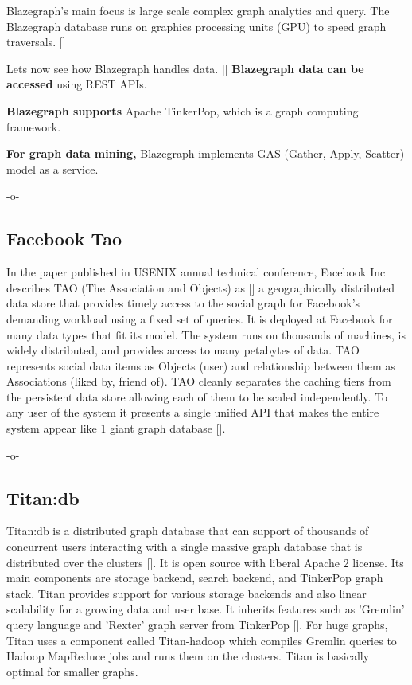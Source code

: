 Blazegraph's main focus is large scale complex graph analytics and
query.  The Blazegraph database runs on graphics processing units
(GPU) to speed graph traversals. [\cite{paper-blzgraph}]

Lets now see how Blazegraph handles data. [\cite{www-blzgraph}] {\bf
Blazegraph data can be accessed} using REST APIs.

{\bf Blazegraph supports} Apache TinkerPop, which is a graph computing
 framework.

{\bf For graph data mining,} Blazegraph implements GAS (Gather, Apply,
Scatter) model as a service.

     -o-

\subsection{Facebook Tao}

In the paper published in USENIX annual technical conference, Facebook
Inc describes TAO (The Association and Objects) as [\cite{book-tao}] a
geographically distributed data store that provides timely access to
the social graph for Facebook's demanding workload using a fixed set
of queries. It is deployed at Facebook for many data types that fit
its model. The system runs on thousands of machines, is widely
distributed, and provides access to many petabytes of data. TAO
represents social data items as Objects (user) and relationship
between them as Associations (liked by, friend of).  TAO cleanly
separates the caching tiers from the persistent data store allowing
each of them to be scaled independently. To any user of the system it
presents a single unified API that makes the entire system appear like
1 giant graph database [\cite{www-tao}].

     -o-

\subsection{Titan:db}

Titan:db is a distributed graph database that can support of thousands
of concurrent users interacting with a single massive graph database
that is distributed over the clusters [\cite{www-Titan}]. It is open
source with liberal Apache 2 license. Its main components are storage
backend, search backend, and TinkerPop graph stack. Titan provides
support for various  storage backends and also linear scalability for
a growing data and user base. It inherits features such as 'Gremlin'
query language and 'Rexter' graph server from
TinkerPop [\cite{www-TinkerPop}].  For huge graphs, Titan uses a
component called Titan-hadoop which compiles Gremlin queries to Hadoop
MapReduce jobs and runs them on the clusters. Titan is basically
optimal for smaller graphs.

